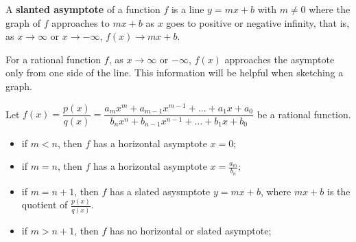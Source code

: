 \begin{definition}
  A \textbf{slanted asymptote} of a function $f$ is a line $y=mx+b$ with $m\ne 0$ where the graph of $f$ approaches to $mx+b$ as $x$ goes to positive or negative infinity, that is,   
as $x\rightarrow \infty$ or $x\rightarrow -\infty$, $f(x)\rightarrow mx+b$.
\end{definition}

\begin{note}
  For a rational function $f$, as $x\rightarrow \infty$ or $-\infty$, $f(x)$ approaches the asymptote only from one side of the line. This information will be helpful when sketching a graph.
\end{note}


\begin{proposition}
Let $f(x)=\dfrac{p(x)}{q(x)}=\dfrac{a_mx^m+a_{m-1}x^{m-1}+...+a_1x+a_0}{b_nx^n+b_{n-1}x^{n-1}+...+b_1x+b_0}$ be a rational function.
\begin{itemize}
  \item if $m<n$, then $f$ has a horizontal asymptote $x=0$;
  \item if $m=n$, then $f$ has a horizontal asymptote $x=\frac{a_m}{b_n}$;
  \item if $m=n+1$, then $f$ has a slated asysmptote $y=mx+b$, where $mx+b$ is the quotient of $\frac{p(x)}{q(x)}$.
  \item if $m>n+1$, then $f$ has no horizontal or slated asymptote;
\end{itemize}
\end{proposition}

\newpage

